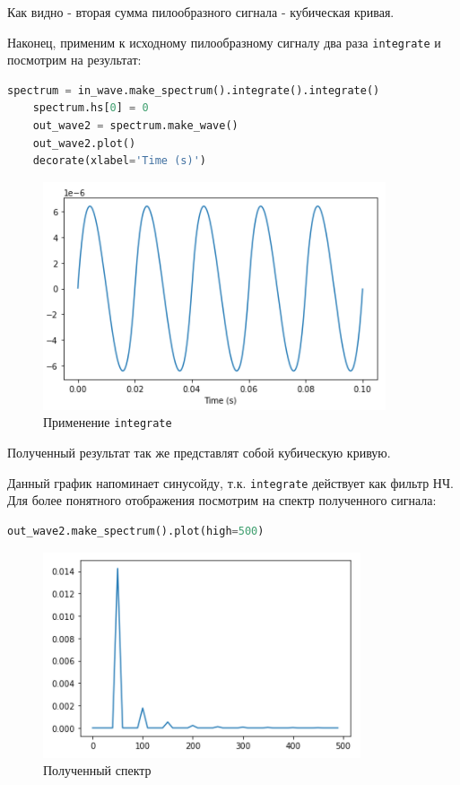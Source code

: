 \documentclass[a4paper]{article}
\begin{document}
            Как видно - вторая сумма пилообразного сигнала - кубическая кривая.
            
            Наконец, применим к исходному пилообразному сигналу два раза \texttt{integrate} и посмотрим на результат:
            
\begin{lstlisting}[language=Python, caption= Применение \texttt{integrate}]
    spectrum = in_wave.make_spectrum().integrate().integrate()
    spectrum.hs[0] = 0
    out_wave2 = spectrum.make_wave()
    out_wave2.plot()
    decorate(xlabel='Time (s)')
\end{lstlisting}
            
            \begin{figure}[H]
                \centering
                \includegraphics{ex_4_4.png}
                \caption{Применение \texttt{integrate}}
                \label{fig:ex_4_4}
            \end{figure}
            
            Полученный результат так же представлят собой кубическую кривую.
            
            Данный график напоминает синусойду, т.к. \texttt{integrate} действует как фильтр НЧ. Для более понятного отображения посмотрим на спектр полученного сигнала:
            
\begin{lstlisting}[language=Python, caption= Применение спектра]
    out_wave2.make_spectrum().plot(high=500)
\end{lstlisting}
            
            \begin{figure}[H]
                \centering
                \includegraphics{ex_4_5.png}
                \caption{Полученный спектр}
                \label{fig:ex_4_5}
            \end{figure}
            
\end{document}
